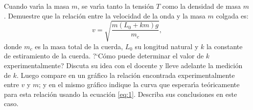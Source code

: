 \documentclass[laboratorio]{guia}
\begin{document}
Cuando var\'\i a la masa $m$, se var\'\i a tanto la tensi\'on $T$ como la
densidad de masa $m$. Demuestre que la relaci\'on entre la velocidad de la onda
y la masa $m$ colgada es:
\begin{equation}
    v = \sqrt{\frac{m (L_0 + k m)g}{m_c}},
    \label{eq:1}
\end{equation}
donde $m_c$ es la masa total de la cuerda, $L_0$ su longitud natural y $k$ la
constante de estiramiento de la cuerda. ?`C\'omo puede determinar el valor de $k$
experimentalmente? Discuta su idea con el docente y lleve adelante la
medici\'on de $k$. Luego compare en un gr\'afico la relaci\'on encontrada
experimentalmente entre $v$ y $m$; y en el mismo gr\'afico indique la curva que
esperar\'\i a te\'oricamente para esta relaci\'on usando la ecuaci\'on
\eqref{eq:1}. Describa sus conclusiones en este caso.



\nocite{Alonso1998,Crawford1994}
 

\end{document}
